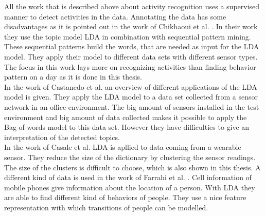 All the work that is described above about activity recognition uses a supervised manner to detect activities in the data. Annotating the data has some disadvantages as it is pointed out in the work of Chikhaoui et al. \cite{journals/percom/ChikhaouiWP12}. In their work they use the topic model LDA in combination with sequential pattern mining. These sequential patterns build the words, that are needed as input for the LDA model. They apply their model to different data sets with different sensor types. The focus in this work lays more on recognizing activities than finding behavior pattern on a day as it is done in this thesis.\\
In the work of Castanedo et al. \cite{EXSY:EXSY12033} an overview of different applications of the LDA model is given. They apply the LDA model to a data set collected from a sensor network in an office environment. The big amount of sensors installed in the test environment and big amount of data collected makes it possible to apply the Bag-of-words model to this data set. However they have difficulties to give an interpretation of the detected topics.\\
In the work of Casale et al. \cite{Casale:2009} LDA is apllied to data coming from a wearable sensor. They reduce the size of the dictionary by clustering the sensor readings. The size of the clusters is difficult to choose, which is also shown in this thesis.
A different kind of data is used in the work of Farrahi et al. \cite{farrahi2008daily}. Cell information of mobile phones give information about the location of a person. With LDA they are able to find different kind of behaviors of people. They use a nice feature representation with which transitions of people can be modelled.